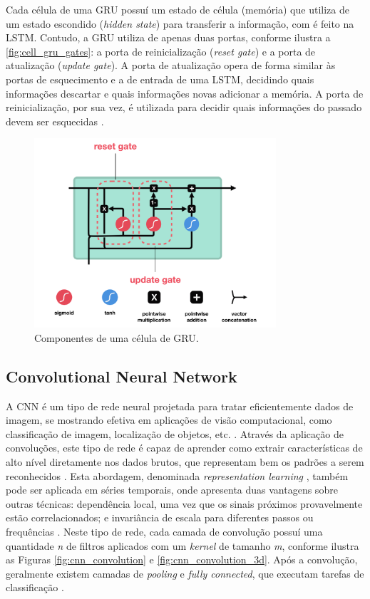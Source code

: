 Cada célula de uma GRU possuí um estado de célula (memória) que utiliza de um estado escondido (\textit{hidden state}) para transferir a informação, com é feito na LSTM. Contudo, a GRU utiliza de apenas duas portas, conforme ilustra a \autoref{fig:cell_gru_gates}: a porta de reinicialização (\textit{reset gate}) e a porta de atualização (\textit{update gate}). A porta de atualização opera de forma similar às portas de esquecimento e a de entrada de uma LSTM, decidindo quais informações descartar e quais informações novas adicionar a memória. A porta de reinicialização, por sua vez, é utilizada para decidir quais informações do passado devem ser esquecidas \cite{Phi2020}.

\begin{figure}[h]
  \centering
  \caption{Componentes de uma célula de GRU.}
   \label{fig:cell_gru_gates}
   \includegraphics[width=0.8\textwidth]{figuras/fig_10.png}
\end{figure}

\subsection{Convolutional Neural Network}

A CNN é um tipo de rede neural projetada para tratar eficientemente dados de imagem, se mostrando efetiva em aplicações de visão computacional, como classificação de imagem, localização de objetos, etc. \cite{Brownlee2018}. Através da aplicação de convoluções, este tipo de rede é capaz de aprender como extrair características de alto nível diretamente nos dados brutos, que representam bem os padrões a serem reconhecidos \cite{Dixon2019,Goodfellow2016}. Esta abordagem, denominada \textit{representation learning} \cite{Brownlee2018}, também pode ser aplicada em séries temporais, onde apresenta duas vantagens sobre outras técnicas: dependência local, uma vez que os sinais próximos provavelmente estão correlacionados; e invariância de escala para diferentes passos ou frequências \cite{Wang2019}. Neste tipo de rede, cada camada de convolução possuí uma quantidade \emph{n} de filtros aplicados com um \textit{kernel} de tamanho \emph{m}, conforme ilustra as Figuras \ref{fig:cnn_convolution} e \ref{fig:cnn_convolution_3d}. Após a convolução, geralmente existem camadas de \textit{pooling} e \textit{fully connected}, que executam tarefas de classificação \cite{Wang2019}.

